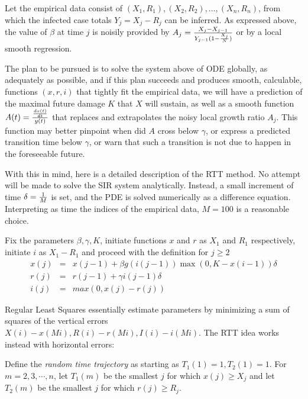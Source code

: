 \documentclass{article}
\begin{document}
\bigskip

Let the empirical data consist of $(X_1,R_1), (X_2,R_2), \dots, (X_n, R_n)$, from which the infected case totals $Y_j=X_j-R_j$ can be inferred. As expressed above, the value of $\beta$ at time $j$ is noisily provided by $A_j={{X_j-X_{j-1}} \over {Y_{j-1}(1-{{X_j} \over N})}}$ or by a local smooth regression.

The plan to be pursued is to solve the system above of ODE globally, as adequately as possible, and if this plan succeeds and produces smooth, calculable, functions $(x,r,i)$ that tightly fit the empirical data, we will have a prediction of the maximal future damage $K$ that $X$ will sustain, as well as a smooth function $A(t)={{{dx(t)} \over {dt}} \over {y(t)}}$ that replaces and extrapolates the noisy local growth ratio $A_j$. This function may better pinpoint when did $A$ cross below $\gamma$, or express a predicted transition time below $\gamma$, or warn that such a transition is not due to happen in the foreseeable future.

\bigskip

With this in mind, here is a detailed description of the RTT method. No attempt will be made to solve the SIR system analytically. Instead, a small increment of time $\delta={1 \over M}$ is set, and the PDE is solved numerically as a difference equation. Interpreting as time the indices of the empirical data, $M=100$ is a reasonable choice.

Fix the parameters $\beta, \gamma, K$, initiate functions $x$ and $r$ as $X_1$ and $R_1$ respectively, initiate $i$ as $X_1-R_1$ and proceed with the definition for $j \ge 2$
\begin{eqnarray}
x(j)&=&x(j-1)+\beta g(i(j-1))\max(0,K-x(i-1)) \delta \nonumber \\
r(j)&=&r(j-1)+\gamma i(j-1) \delta \nonumber \\
i(j)&=&max(0,x(j)-r(j)) \label{thesolution}
\end{eqnarray}

Regular Least Squares essentially estimate parameters by minimizing a sum of squares of the vertical errors $X(i)-x(M i), R(i)-r(M i), I(i)-i(M i)$. The RTT idea works instead with horizontal errors:

\bigskip

Define the {\em random time trajectory} as starting as $T_1(1)=1, T_2(1)=1$. For $m=2,3,\cdots,n$, let $T_1(m)$ be the smallest $j$ for which $x(j) \ge X_j$ and let $T_2(m)$ be the smallest $j$ for which $r(j) \ge R_j$.
\end{document}
